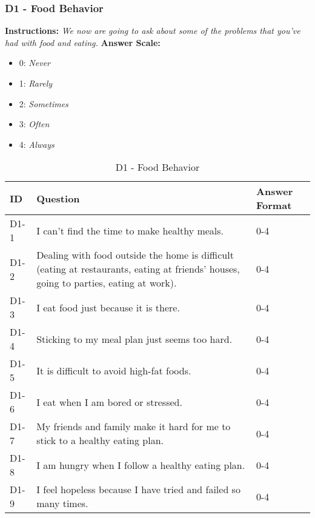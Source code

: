 \subsubsection{D1 - Food Behavior}\label{sec:D1-food-behavior}
\textbf{Instructions:} \emph{We now are going to ask about some of the problems that you've had with food and eating.}
\textbf{Answer Scale:}
\begin{itemize}
    \item 0: \emph{Never}
    \item 1: \emph{Rarely}
    \item 2: \emph{Sometimes}
    \item 3: \emph{Often}
    \item 4: \emph{Always}
\end{itemize}
\begin{table}[H]
    \centering
    \renewcommand{\arraystretch}{1.2}
    \begin{tabularx}{\textwidth}{|l|X|l|}
        \hline
        \textbf{ID} & \textbf{Question} & \textbf{Answer Format} \\ \hline
        D1-1 & I can't find the time to make healthy meals. & 0-4 \\ \hline
        D1-2 & Dealing with food outside the home is difficult (eating at restaurants, eating at friends' houses, going to parties, eating at work). & 0-4 \\ \hline
        D1-3 & I eat food just because it is there. & 0-4 \\ \hline
        D1-4 & Sticking to my meal plan just seems too hard. & 0-4 \\ \hline
        D1-5 & It is difficult to avoid high-fat foods. & 0-4 \\ \hline
        D1-6 & I eat when I am bored or stressed. & 0-4 \\ \hline
        D1-7 & My friends and family make it hard for me to stick to a healthy eating plan. & 0-4 \\ \hline
        D1-8 & I am hungry when I follow a healthy eating plan. & 0-4 \\ \hline
        D1-9 & I feel hopeless because I have tried and failed so many times. & 0-4 \\ \hline
    \end{tabularx}
    \caption{D1 - Food Behavior}
    \label{tab:food-behavior}
\end{table}


